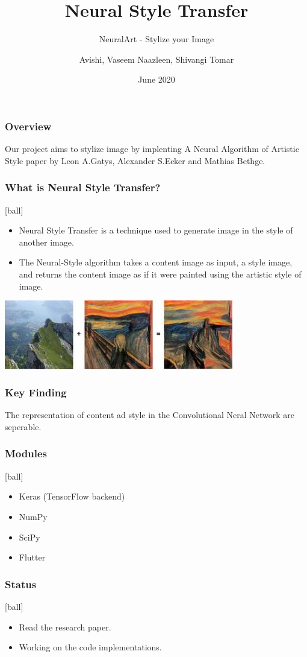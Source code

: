 \documentclass[14pt]{beamer}
\title[NST]{Neural Style Transfer}
\subtitle{NeuralArt - Stylize your Image}
\author[Team - 38]{Avishi, Vaseem Naazleen, Shivangi Tomar}
\date{June 2020}
\begin{document}
\begin{frame}
   \titlepage
\end{frame}

\begin{frame}
		\frametitle{Overview}
		Our project aims to stylize image by implenting A Neural Algorithm of Artistic Style paper by Leon A.Gatys, Alexander S.Ecker and Mathias Bethge.
\end{frame}

\begin{frame}
		\frametitle{What is Neural Style Transfer?}
		\begin{itemize}
		\item Neural Style Transfer is a technique used to generate image in the style of another image.
		\item The Neural-Style algorithm takes a content image as input, a style image, and returns the content image as if it were painted using the artistic style of image.
		\end{itemize}
		\includegraphics[width=100mm]{image.jpg}
\end{frame}

\begin{frame}
		\frametitle{Key Finding}
		The representation of content ad style in the Convolutional Neral Network are seperable.
\end{frame}

\begin{frame}
		\frametitle{Modules}
		\begin{itemize}
		\item Keras (TensorFlow backend)
		\item NumPy
		\item SciPy
		\item Flutter
		\end{itemize}
\end{frame}

\begin{frame}
		\frametitle{Status}
		\begin{itemize}
		\item Read the research paper.
		\item Working on the code implementations.
		\end{itemize}
\end{frame}
\end{document}
